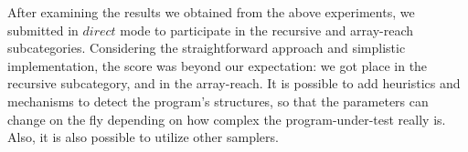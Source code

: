 After examining the results we obtained from the above experiments, we submitted \PACMAN in $direct$ mode to participate in the recursive and array-reach subcategories. Considering the straightforward approach and simplistic implementation, the score was beyond our expectation: we got  place in the recursive subcategory, and  in the array-reach. It is possible to add heuristics and mechanisms to detect the program's structures, so that the parameters can change on the fly depending on how complex the program-under-test really is. Also, it is also possible to utilize other samplers.

\begin{comment}

\section{Implementation}

\begin{figure}[t]
\begin{center}
\begin{tikzpicture}[
  node distance=1cm and 1.2cm, auto,>=latex', thick,
  decision/.style = {diamond, aspect=2, draw, align=center},
      data/.style = {draw,trapezium,trapezium left angle=70,
                     trapezium right angle=-70,minimum height=0.6cm},
     input/.style = {data, text width=18mm},
    output/.style = {rounded corners, draw, text width=1.5cm, align=center,
                     minimum height=0.7cm},
]
  \node[decision] (analyzer) {Analyzer};
  \node[input, left=of analyzer] (rf_prog) {Intra-proc. Program};

  \node[data, above=.5cm of analyzer,text width=20mm] (proof) {Summary Candidates};

  \node[decision,above=.5cm of proof] (check) {Check};

  \node[input] (rc_prog) at (rf_prog |- check) {Recursive Program};
  \node[output, right=of analyzer] (unsafe) {FALSE};
  \node[output] (safe) at (check -| unsafe) {TRUE};

  \path[->]
    (rf_prog) edge (analyzer)
    (analyzer) edge node[anchor=north,sloped]{Error} (unsafe);

  \path[->]
    (rc_prog) edge 
      node[anchor=east]{Under-approx.}
    (rf_prog);

  \path[->]
    (analyzer) edge node[anchor=west]{Pass, Compute Summaries} (proof);
  \path[->]
    (proof) edge (check)
    (check) edge node[anchor=south,sloped]{Error, Refine} (rf_prog)
    (check) edge node[anchor=south,sloped]{Pass} (safe);


\end{comment}
